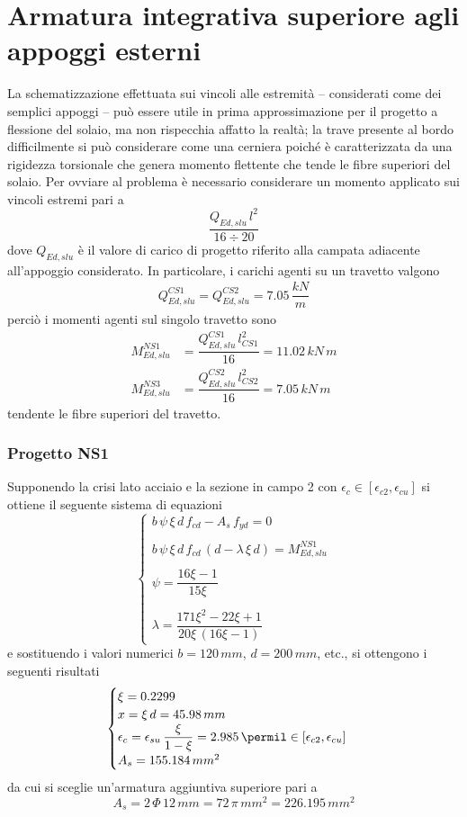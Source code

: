 \section{Armatura integrativa superiore agli appoggi esterni}
La schematizzazione effettuata sui vincoli alle estremità  -- considerati come dei semplici appoggi -- può essere utile in prima approssimazione per il progetto a flessione del solaio, ma non rispecchia affatto la realtà; la trave presente al bordo difficilmente si può considerare come una cerniera poiché è caratterizzata da una rigidezza torsionale che genera momento flettente che tende le fibre superiori del solaio. Per ovviare al problema è necessario considerare un momento applicato sui vincoli estremi pari a
\[
\dfrac{Q_{Ed,slu}\,l^2}{16\div 20}
\]
dove $Q_{Ed, slu}$ è il valore di carico di progetto riferito alla campata adiacente all'appoggio considerato. In particolare, i carichi agenti su un travetto valgono
\begin{align*}
	Q_{Ed,slu}^{CS1} =Q_{Ed,slu}^{CS2}= 7.05\,\dfrac{kN}{m}
\end{align*}
perciò i momenti agenti sul singolo travetto sono
\begin{align*}
	M_{Ed,slu}^{NS1} &=\dfrac{Q_{Ed,slu}^{CS1}\,l_{CS1}^2}{16} = 11.02\,kN\,m\\
	M_{Ed,slu}^{NS3} &= \dfrac{Q_{Ed,slu}^{CS2}\,l_{CS2}^2}{16} = 7.05\,kN\,m
\end{align*}
tendente le fibre superiori del travetto.

\subsubsection{Progetto NS1}
Supponendo la crisi lato acciaio e la sezione in campo 2 con $\epsilon_c \in [\epsilon_{c2}, \epsilon_{cu}]$ si ottiene il seguente sistema di equazioni
\[
\begin{cases}
	b\,\psi\,\xi\,d\,f_{cd} - A_s\,f_{yd} = 0\\\\
	b\,\psi\,\xi\,d\,f_{cd}\,(d - \lambda\,\xi\,d) = M_{Ed,slu}^{NS1}\\\\
	\psi = \dfrac{16\xi -1}{15\xi}\\\\
	\lambda = \dfrac{171\xi^2 - 22\xi +1}{20\xi\,(16\xi-1)}    
\end{cases}
\]
e sostituendo i valori numerici $b = 120\,mm$, $d=200\,mm$, etc., si ottengono i seguenti risultati
\[
\begin{cases}
    \xi = 0.2299\\
	x = \xi\,d = 45.98\,mm\\
	\epsilon_c = \epsilon_{su}\,\dfrac{\xi}{1-\xi} = 2.985\,\permil \in [\epsilon_{c2}, \epsilon_{cu}]\\
	A_s = 155.184\,mm^2	
\end{cases}
\]
da cui si sceglie un'armatura aggiuntiva superiore pari a
\[
    A_s = 2\,\Phi\,12\,mm = 72\,\pi\,mm^2 = 226.195\,mm^2
\]

